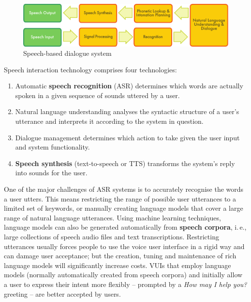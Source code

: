 \begin{multicols}{2}
\begin{figure}[htb]
  \center
  \includegraphics[width=\textwidth]{../_media/english/simple_speech-based_dialogue_architecture}
  \caption{Speech-based dialogue system}
  \label{fig:dialoguearch_en}
\end{figure}

Speech interaction technology comprises four technologies: 

\begin{enumerate}[itemsep=0pt,parsep=0pt]
\item Automatic \textbf{speech recognition} (ASR) determines which words are actually spoken in a given sequence of sounds uttered by a user.  
\item Natural language understanding analyses the syntactic structure of a user’s utterance and interprets it according to the system in question.
\item Dialogue management determines which action to take given the user input and system functionality.   
\item \textbf{Speech synthesis} (text-to-speech or TTS) transforms the system’s reply into sounds for the user.
\end{enumerate}

One of the major challenges of ASR systems is to accurately recognise the words a user utters. This means restricting the range of possible user utterances to a limited set of keywords, or manually creating language models that cover a large range of natural language utterances. Using machine learning techniques, language models can also be generated automatically from \textbf{speech corpora}, i.\,e., large collections of speech audio files and text transcriptions. Restricting utterances usually forces people to use the voice user interface in a rigid way and can damage user acceptance; but the creation, tuning and maintenance of rich language models will significantly increase costs. VUIs that employ language models (normally automatically created from speech corpora) and initially allow a user to express their intent more flexibly -- prompted by a \textit{How may I help you?} greeting -- are better accepted by users.


\end{multicols}
